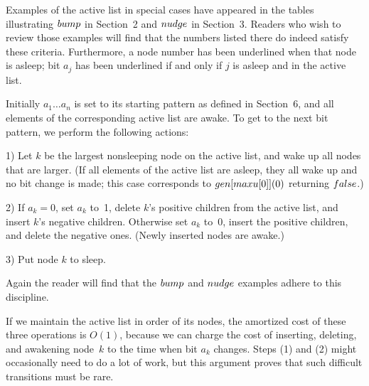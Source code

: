 Examples of the active list in special cases have appeared
in the tables illustrating $\\{bump}$ in Section~2 and
$\\{nudge}$ in Section~3.  Readers who wish to review those
examples will find that the numbers listed there do indeed
satisfy these criteria.  Furthermore, a node number has been
underlined when that node is asleep; bit $a_j$ has been
underlined if and only if $j$ is asleep and in the active
list.

Initially $a_1\ldots a_n$ is set to its starting pattern as
defined in Section~6, and all elements of the corresponding
active list are awake.  To get to the next bit pattern, we
perform the following actions:

\smallskip
\item{1)}  Let $k$ be the largest nonsleeping node on the
active list, and wake up all nodes that are larger.  (If all
elements of the active list are asleep, they all wake up and
no bit change is made; this case corresponds to $\\{gen}
[\\{maxu}[0]](0)$ returning $\\{false}$.)
\item{2)}  If $a_k=0$, set $a_k$ to~1, delete $k$'s
positive children from the active list, and insert $k$'s
negative children.  Otherwise set $a_k$ to~0, insert the
positive children, and delete the negative ones.  (Newly
inserted nodes are awake.)
\item{3)}  Put node $k$ to sleep.

\smallskip\noindent
Again the reader will find that the $\\{bump}$ and
$\\{nudge}$ examples adhere to this discipline.

If we maintain the active list in order of its nodes, the
amortized cost of these three operations is $O(1)$, because
we can charge the cost of inserting, deleting, and awakening
node~$k$ to the time when bit $a_k$ changes.  Steps (1) and
(2) might occasionally need to do a lot of work, but this
argument proves that such difficult transitions must be
rare.

